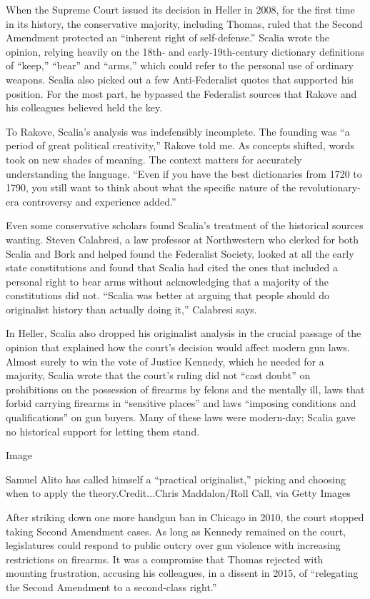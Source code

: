 When the Supreme Court issued its decision in Heller in 2008, for the
first time in its history, the conservative majority, including Thomas,
ruled that the Second Amendment protected an ``inherent right of
self-defense.'' Scalia wrote the opinion, relying heavily on the 18th-
and early-19th-century dictionary definitions of ``keep,'' ``bear'' and
``arms,'' which could refer to the personal use of ordinary weapons.
Scalia also picked out a few Anti-Federalist quotes that supported his
position. For the most part, he bypassed the Federalist sources that
Rakove and his colleagues believed held the key.

To Rakove, Scalia's analysis was indefensibly incomplete. The founding
was ``a period of great political creativity,'' Rakove told me. As
concepts shifted, words took on new shades of meaning. The context
matters for accurately understanding the language. ``Even if you have
the best dictionaries from 1720 to 1790, you still want to think about
what the specific nature of the revolutionary-era controversy and
experience added.''

Even some conservative scholars found Scalia's treatment of the
historical sources wanting. Steven Calabresi, a law professor at
Northwestern who clerked for both Scalia and Bork and helped found the
Federalist Society, looked at all the early state constitutions and
found that Scalia had cited the ones that included a personal right to
bear arms without acknowledging that a majority of the constitutions did
not. ``Scalia was better at arguing that people should do originalist
history than actually doing it,'' Calabresi says.

In Heller, Scalia also dropped his originalist analysis in the crucial
passage of the opinion that explained how the court's decision would
affect modern gun laws. Almost surely to win the vote of Justice
Kennedy, which he needed for a majority, Scalia wrote that the court's
ruling did not ``cast doubt'' on prohibitions on the possession of
firearms by felons and the mentally ill, laws that forbid carrying
firearms in ``sensitive places'' and laws ``imposing conditions and
qualifications'' on gun buyers. Many of these laws were modern-day;
Scalia gave no historical support for letting them stand.

Image

Samuel Alito has called himself a ``practical originalist,'' picking and
choosing when to apply the theory.Credit...Chris Maddalon/Roll Call, via
Getty Images

After striking down one more handgun ban in Chicago in 2010, the court
stopped taking Second Amendment cases. As long as Kennedy remained on
the court, legislatures could respond to public outcry over gun violence
with increasing restrictions on firearms. It was a compromise that
Thomas rejected with mounting frustration, accusing his colleagues, in a
dissent in 2015, of ``relegating the Second Amendment to a second-class
right.''

